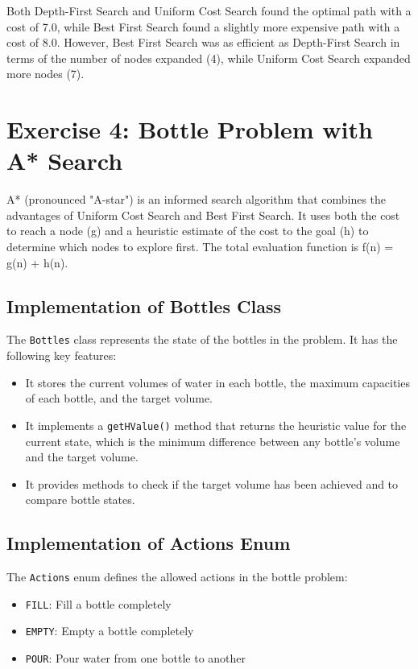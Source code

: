 \documentclass[12pt,a4paper]{article}
\newenvironment{infobox}[1]
  {\begin{tcolorbox}[colback=boxcolor,colframe=sectioncolor,title=#1,fonttitle=\bfseries]}
  {\end{tcolorbox}}
\begin{document}
Both Depth-First Search and Uniform Cost Search found the optimal path with a cost of 7.0, while Best First Search found a slightly more expensive path with a cost of 8.0. However, Best First Search was as efficient as Depth-First Search in terms of the number of nodes expanded (4), while Uniform Cost Search expanded more nodes (7).

\section{Exercise 4: Bottle Problem with A* Search}

\begin{infobox}{What is A* Search?}
A* (pronounced "A-star") is an informed search algorithm that combines the advantages of Uniform Cost Search and Best First Search. It uses both the cost to reach a node (g) and a heuristic estimate of the cost to the goal (h) to determine which nodes to explore first. The total evaluation function is f(n) = g(n) + h(n).
\end{infobox}

\subsection{Implementation of Bottles Class}

The \texttt{Bottles} class represents the state of the bottles in the problem. It has the following key features:

\begin{itemize}
    \item It stores the current volumes of water in each bottle, the maximum capacities of each bottle, and the target volume.
    \item It implements a \texttt{getHValue()} method that returns the heuristic value for the current state, which is the minimum difference between any bottle's volume and the target volume.
    \item It provides methods to check if the target volume has been achieved and to compare bottle states.
\end{itemize}

\subsection{Implementation of Actions Enum}

The \texttt{Actions} enum defines the allowed actions in the bottle problem:

\begin{itemize}
    \item \texttt{FILL}: Fill a bottle completely
    \item \texttt{EMPTY}: Empty a bottle completely
    \item \texttt{POUR}: Pour water from one bottle to another
\end{itemize}
\end{document}
